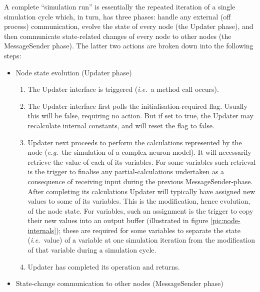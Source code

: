 \documentclass[pdftex,a4paper]{article}
\newcommand{\ie}{{\em i.e.\ }}
\newcommand{\eg}{{\em e.g.\ }}
\begin{document}
A complete ``simulation run'' is essentially the repeated iteration of
a single simulation cycle which, in turn, has three phases: handle any
external (off process) communication, evolve the state of every node
(the Updater phase), and then communicate state-related changes of
every node to other nodes (the MessageSender phase). The latter two
actions are broken down into the following steps:

\begin{itemize}

\item Node state evolution (Updater phase)

\begin{enumerate}

\item The Updater interface is triggered (\ie a method call occurs).

\item The Updater interface first polls the initialisation-required
  flag. Usually this will be false, requiring no action. But if set to
  true, the Updater may recalculate internal constants, and will reset
  the flag to false.

\item Updater next proceeds to perform the calculations represented by
  the node (\eg the simulation of a complex neuron model). It will
  necessarily retrieve the value of each of its variables. For some
  variables such retrieval is the trigger to finalise any
  partial-calculations undertaken as a consequence of receiving input
  during the previous MessageSender-phase. After completing its
  calculations Updater will typically have assigned new values to some
  of its variables. This is the modification, hence evolution, of the
  node state. For variables, such an assignment is the trigger to copy
  their new values into an output buffer (illustrated in figure
  \ref{pic:node-internals}); these are required for some variables to
  separate the state (\ie value) of a variable at one simulation
  iteration from the modification of that variable during a simulation
  cycle.

\item Updater has completed its operation and returns.

\end{enumerate}

\item State-change communication to other nodes (MessageSender phase)

  \begin{enumerate}


\end{enumerate}
\end{itemize}
\end{document}
